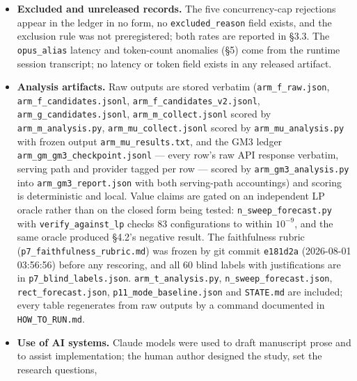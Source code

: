 \begin{itemize}
  raw output, arm label and sample id is byte-identical to v1, verified field by field, each
  corrected field carrying a sibling \texttt{*\_v1} field. \texttt{arm\_f\_candidates.jsonl} is unmodified
  (sha256 \texttt{02ecabcd\ldots}); v2 is \texttt{9f845f78\ldots}. Correction rules, sources, wave-boundary arithmetic
  and caveats --- including that \texttt{run\_date} has day granularity only --- are in
  \textbf{\texttt{ledger\_v2\_corrections.md}}. Analysis scripts read v2.
\item \textbf{Excluded and unreleased records.} The five concurrency-cap rejections appear in the ledger
  in no form, no \texttt{excluded\_reason} field exists, and the exclusion rule was not preregistered;
  both rates are reported in \S3.3. The \texttt{opus\_alias} latency and token-count anomalies (\S5) come
  from the runtime session transcript; no latency or token field exists in any released artifact.
\item \textbf{Analysis artifacts.} Raw outputs are stored verbatim (\texttt{arm\_f\_raw.json},
  \texttt{arm\_f\_candidates.jsonl}, \texttt{arm\_f\_candidates\_v2.jsonl}, \texttt{arm\_g\_candidates.jsonl},
  \texttt{arm\_m\_collect.jsonl} scored by \texttt{arm\_m\_analysis.py}, \texttt{arm\_mu\_collect.jsonl} scored by
  \texttt{arm\_mu\_analysis.py} with frozen output \texttt{arm\_mu\_results.txt}, and the GM3 ledger
  \texttt{arm\_gm\_gm3\_checkpoint.jsonl} --- every row's raw API response verbatim, serving path and
  provider tagged per row --- scored by \texttt{arm\_gm3\_analysis.py} into \texttt{arm\_gm3\_report.json}
  with both serving-path accountings) and scoring is deterministic and local. Value claims are gated on an independent LP oracle rather than on the
  closed form being tested: \texttt{n\_sweep\_forecast.py} with \texttt{verify\_against\_lp} checks 83
  configurations to within $10^{-9}$, and the same oracle produced \S4.2's negative result. The
  faithfulness rubric (\texttt{p7\_faithfulness\_rubric.md}) was frozen by git commit \texttt{e181d2a}
  (2026-08-01 03:56:56) before any rescoring, and all 60 blind labels with justifications are in
  \texttt{p7\_blind\_labels.json}. \texttt{arm\_t\_analysis.py}, \texttt{n\_sweep\_forecast.json}, \texttt{rect\_forecast.json},
  \texttt{p11\_mode\_baseline.json} and \texttt{STATE.md} are included; every table regenerates from raw outputs
  by a command documented in \texttt{HOW\_TO\_RUN.md}.
\item \textbf{Use of AI systems.} Claude models were used to draft manuscript prose and to
  assist implementation; the human author designed the study, set the research questions,

\end{itemize}
